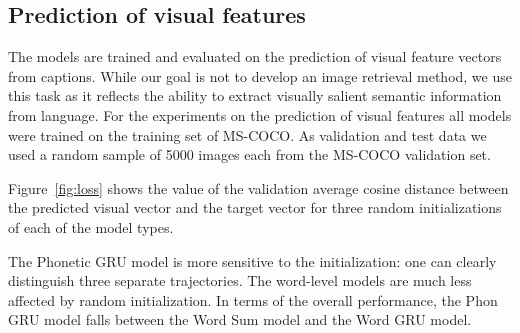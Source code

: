 \subsection{Prediction of visual features}
\label{subsec:visual}
The models are trained and evaluated on the prediction of visual
feature vectors from captions. While our goal is not to develop an
image retrieval method, we use this task as it reflects the ability to extract visually salient semantic information from language.
For the experiments on the prediction of visual features all models
were trained on the training set of MS-COCO. As validation and test data we
used a random sample of 5000 images each from the MS-COCO validation set. 

Figure~\ref{fig:loss} shows the value of the validation average cosine distance
between the predicted visual vector and the target vector for three
random initializations of each of the model types. 

The Phonetic GRU model is more sensitive to the initialization: one
can clearly distinguish three separate trajectories. The word-level models
are much less affected by random initialization. In terms of the
overall performance, the {\sc Phon GRU} model falls between the
{\sc Word Sum} model and the {\sc Word GRU} model.

